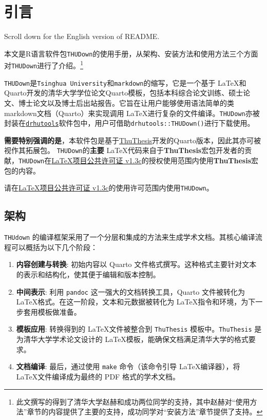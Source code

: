 
\hypertarget{ux5f15ux8a00}{%
\chapter{引言}\label{ux5f15ux8a00}}

Scroll down for the English version of README.

本文是R语言软件包\texttt{THUDown}的使用手册，从架构、安装方法和使用方法三个方面对\texttt{THUDown}进行了介绍。\footnote{此文撰写的得到了清华大学赵赫和成功两位同学的支持，其中赵赫对``使用方法''章节的内容提供了主要的支持，成功同学对``安装方法''章节提供了支持。}

\texttt{THUDown}是\texttt{Tsinghua\ University}和\texttt{markdown}的缩写，它是一个基于
\LaTeX 和
Quarto开发的清华大学学位论文Quarto模板，包括本科综合论文训练、硕士论文、博士论文以及博士后出站报告。它旨在让用户能够使用语法简单的类markdown文档（Quarto）来实现调用
\LaTeX 进行复杂的文件编译。\texttt{THUDown}亦被封装在\href{https://sammo3182.github.io/software/drhutools/}{\texttt{drhutools}}软件包中，用户可借助\texttt{drhutools::THUDown()}进行下载使用。

\textbf{需要特别强调的是}，本软件包是基于\href{https://github.com/tuna/thuthesis}{ThuThesis}开发的Quarto版本，因此其亦可被视作其拓展包。
\texttt{THUDown}的\textbf{主要}
\LaTeX 代码来自于\textbf{ThuThesis}宏包开发者的贡献，\texttt{THUDown}在\href{https://www.latex-project.org/lppl/lppl-1-3c/}{LaTeX项目公共许可证
v1.3c}的授权使用范围内使用\textbf{ThuThesis}宏包的内容。

请在\href{https://www.latex-project.org/lppl/lppl-1-3c/}{LaTeX项目公共许可证
v1.3c}的使用许可范围内使用\texttt{THUDown}。

\hypertarget{ux67b6ux6784}{%
\section{架构}\label{ux67b6ux6784}}

\texttt{THUdown}
的编译框架采用了一个分层和集成的方法来生成学术文档。其核心编译流程可以概括为以下几个阶段：

\begin{enumerate}
\def\labelenumi{\arabic{enumi}.}
\item
  \textbf{内容创建与转换}: 初始内容以 Quarto
  文件格式撰写。这种格式主要针对文本的表示和结构化，使其便于编辑和版本控制。
\item
  \textbf{中间表示}: 利用 \texttt{pandoc} 这一强大的文档转换工具，Quarto
  文件被转化为 \LaTeX 格式。在这一阶段，文本和元数据被转化为
  \LaTeX 指令和环境，为下一步套用模板做准备。
\item
  \textbf{模板应用}: 转换得到的 \LaTeX 文件被整合到 \texttt{ThuThesis}
  模板中。\texttt{ThuThesis} 是为清华大学学术论文设计的
  \LaTeX 模板，能确保文档满足清华大学的格式要求。
\item
  \textbf{文档编译}: 最后，通过使用 \texttt{make} 命令（该命令引导
  \LaTeX 编译器），将 \LaTeX 文件编译成为最终的 PDF 格式的学术文档。
\end{enumerate}


